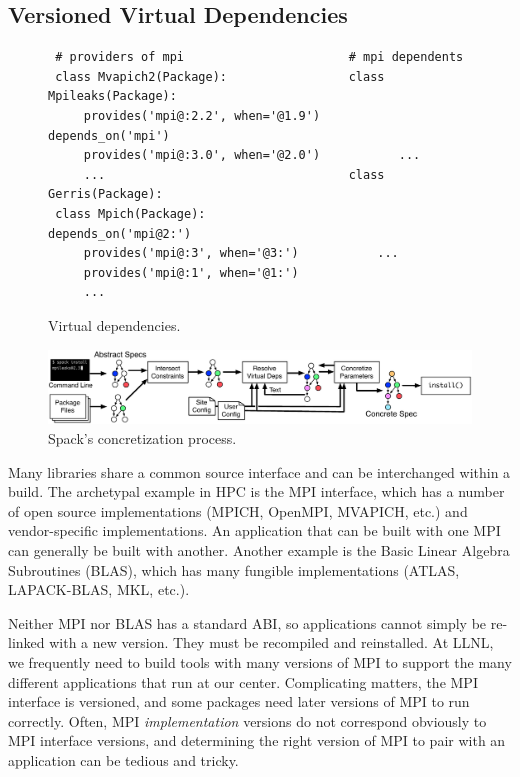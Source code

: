 
\subsection{Versioned Virtual Dependencies}\label{sec:virtual}

\begin{figure}
	\begin{verbatim}
 # providers of mpi                       # mpi dependents
 class Mvapich2(Package):                 class Mpileaks(Package):
     provides('mpi@:2.2', when='@1.9')        depends_on('mpi')
     provides('mpi@:3.0', when='@2.0')           ...
     ...                                  class Gerris(Package):
 class Mpich(Package):                        depends_on('mpi@2:')
     provides('mpi@:3', when='@3:')           ...
     provides('mpi@:1', when='@1:')
     ...
\end{verbatim}
\caption{
	Virtual dependencies.
	\label{fig:virtual-deps}
}
\end{figure}

\begin{figure}[ht!]
	\centering
	\includegraphics[width=.9\textwidth]{figs/concretization.pdf}
	\caption{
		Spack's concretization process.
		\label{fig:concretization}
	}
\end{figure}


Many libraries share a common source interface and can be interchanged
within a build.
The archetypal example in HPC is the MPI interface, which has a number of
open source implementations (MPICH, OpenMPI, MVAPICH, etc.) and vendor-specific
implementations. An application that can be built with one MPI can generally be
built with another.  Another example is the Basic Linear Algebra
Subroutines (BLAS), which has many fungible implementations
(ATLAS, LAPACK-BLAS, MKL, etc.).

Neither MPI nor BLAS has a standard ABI, so applications cannot simply be
re-linked with a new version. They must be recompiled and reinstalled.
At LLNL, we frequently need to build tools with many versions of MPI to support
the many different applications that run at our center.
Complicating matters, the MPI interface is versioned, and some
packages need later versions of MPI to run correctly.  Often, MPI
{\it implementation} versions do not correspond obviously to MPI
interface versions, and determining the right version of
MPI to pair with an application can be tedious and tricky.

